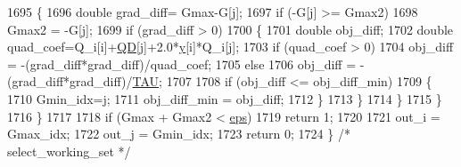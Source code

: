 \begin{DoxyCode}
1695       \{
1696         \textcolor{keywordtype}{double} grad\_diff= Gmax-G[j];
1697         \textcolor{keywordflow}{if} (-G[j] >= Gmax2)
1698           Gmax2 = -G[j];
1699         \textcolor{keywordflow}{if} (grad\_diff > 0)
1700         \{
1701           \textcolor{keywordtype}{double} obj\_diff; 
1702           \textcolor{keywordtype}{double} quad\_coef=Q\_i[i]+\hyperlink{class_s_v_m289___b_f_s_1_1_solver_a28e141b65ab370ba3cfad591f1060b5a}{QD}[j]+2.0*\hyperlink{class_s_v_m289___b_f_s_1_1_solver_ab6e1027acd321351163e02445ac37a48}{y}[i]*Q\_i[j];
1703           \textcolor{keywordflow}{if} (quad\_coef > 0)
1704             obj\_diff = -(grad\_diff*grad\_diff)/quad\_coef;
1705           \textcolor{keywordflow}{else}
1706             obj\_diff = -(grad\_diff*grad\_diff)/\hyperlink{svm289___b_f_s_8cpp_a3d8c9c145887af5174ba4cc6789862ad}{TAU};
1707 
1708           \textcolor{keywordflow}{if} (obj\_diff <= obj\_diff\_min)
1709           \{
1710             Gmin\_idx=j;
1711             obj\_diff\_min = obj\_diff;
1712           \}
1713         \}
1714       \}
1715     \}
1716   \}
1717 
1718   \textcolor{keywordflow}{if}  (Gmax + Gmax2  <  \hyperlink{class_s_v_m289___b_f_s_1_1_solver_abb1bb8ca9d36e39da8cc535b4b49b57c}{eps})
1719     \textcolor{keywordflow}{return} 1;
1720 
1721   out\_i = Gmax\_idx;
1722   out\_j = Gmin\_idx;
1723   \textcolor{keywordflow}{return} 0;
1724 \}  \textcolor{comment}{/* select\_working\_set */}
\end{DoxyCode}
